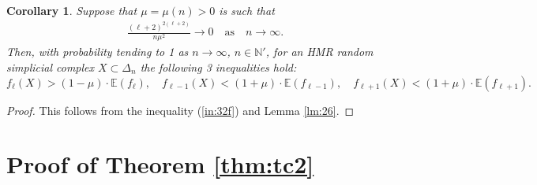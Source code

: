 \documentclass[11pt,twoside, reqno]{amsart}
\theoremstyle{plain}
\newtheorem{corollary}[lema]{Corollary}
\theoremstyle{definition}
\newcommand{\N}{\mathbb{N}}
\newcommand{\E}{\mathbb{E}}
\begin{document}
\begin{corollary}\label{cor:27}
Suppose that $\mu=\mu(n)>0$ is such that 
\begin{eqnarray}\label{eq:38}
\frac{(\ell+2)^{2(\ell+2)}}{n \mu^2} \to 0\quad \mbox{as}\quad  n\to \infty.
 \end{eqnarray} 
 Then, with probability tending to 1 as 
$n\to \infty$, $n\in \N'$, 
for an HMR random simplicial complex $X\subset \Delta_n$ the following 3 inequalities hold:
$$
f_\ell(X)>(1-\mu)\cdot \E(f_\ell), \quad f_{\ell-1}(X)<(1+\mu)\cdot \E(f_{\ell-1}), \quad  f_{\ell+1}(X)<(1+\mu)\cdot \E(f_{\ell+1}). 
$$
\end{corollary}
\begin{proof}
This follows from the inequality (\ref{in:32f}) and Lemma \ref{lm:26}. 
\end{proof}

\section{Proof of Theorem \ref{thm:tc2}}\label{sec:9}
\end{document}
